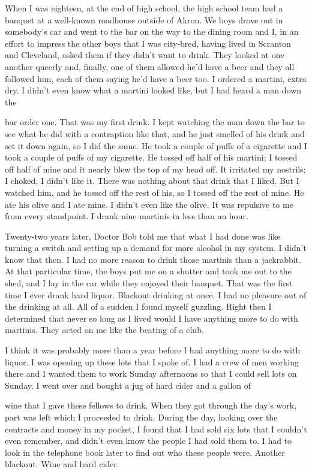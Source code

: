 \begin{biblechapter}
When I was eighteen, at the end of high school, the high school team had a banquet at a well-known roadhouse outside of Akron. We boys drove out in somebody’s car and went to the bar on the way to the dining room and I, in an effort to impress the other boys that I was city-bred, having lived in Scranton and Cleveland, asked them if they didn’t want to drink. They looked at one another queerly and, finally, one of them allowed he’d have a beer and they all followed him, each of them saying he’d have a beer too. I ordered a martini, extra dry. I didn’t even know what a martini looked like, but I had heard a man down the

bar order one. That was my first drink. I kept watching the man down the bar to see what he did with a contraption like that, and he just smelled of his drink and set it down again, so I did the same. He took a couple of puffs of a cigarette and I took a couple of puffs of my cigarette. He tossed off half of his martini; I tossed off half of mine and it nearly blew the top of my head off. It irritated my nostrils; I choked, I didn’t like it. There was nothing about that drink that I liked. But I watched him, and he tossed off the rest of his, so I tossed off the rest of mine. He ate his olive and I ate mine. I didn’t even like the olive. It was repulsive to me from every standpoint. I drank nine martinis in less than an hour.

Twenty-two years later, Doctor Bob told me that what I had done was like turning a switch and setting up a demand for more alcohol in my system. I didn’t know that then. I had no more reason to drink those martinis than a jackrabbit. At that particular time, the boys put me on a shutter and took me out to the shed, and I lay in the car while they enjoyed their banquet. That was the first time I ever drank hard liquor. Blackout drinking at once. I had no pleasure out of the drinking at all. All of a sudden I found myself guzzling. Right then I determined that never so long as I lived would I have anything more to do with martinis. They acted on me like the beating of a club.

I think it was probably more than a year before I had anything more to do with liquor. I was opening up these lots that I spoke of. I had a crew of men working there and I wanted them to work Sunday afternoons so that I could sell lots on Sunday. I went over and bought a jug of hard cider and a gallon of

wine that I gave these fellows to drink. When they got through the day’s work, part was left which I proceeded to drink. During the day, looking over the contracts and money in my pocket, I found that I had sold six lots that I couldn’t even remember, and didn’t even know the people I had sold them to. I had to look in the telephone book later to find out who these people were. Another blackout. Wine and hard cider.


\end{biblechapter}
